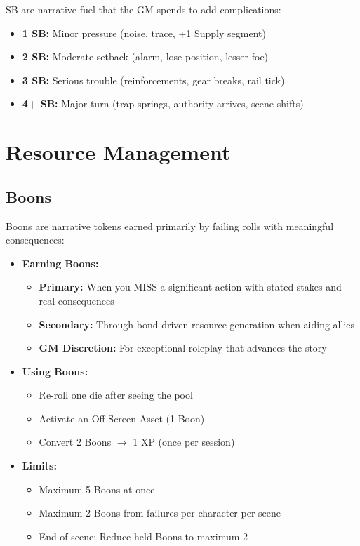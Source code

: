 \documentclass[11pt]{article}
\begin{document}
SB are narrative fuel that the GM spends to add complications:
\begin{itemize}
\item \textbf{1 SB:} Minor pressure (noise, trace, +1 Supply segment)
\item \textbf{2 SB:} Moderate setback (alarm, lose position, lesser foe)
\item \textbf{3 SB:} Serious trouble (reinforcements, gear breaks, rail tick)
\item \textbf{4+ SB:} Major turn (trap springs, authority arrives, scene shifts)
\end{itemize}

\section{Resource Management}

\subsection{Boons}

Boons are narrative tokens earned primarily by failing rolls with meaningful consequences:

\begin{itemize}
\item \textbf{Earning Boons:}
   \begin{itemize}
   \item \textbf{Primary:} When you MISS a significant action with stated stakes and real consequences
   \item \textbf{Secondary:} Through bond-driven resource generation when aiding allies
   \item \textbf{GM Discretion:} For exceptional roleplay that advances the story
   \end{itemize}
\item \textbf{Using Boons:}
   \begin{itemize}
   \item Re-roll one die after seeing the pool
   \item Activate an Off-Screen Asset (1 Boon)
   \item Convert 2 Boons $\rightarrow$ 1 XP (once per session)
   \end{itemize}
\item \textbf{Limits:}
   \begin{itemize}
   \item Maximum 5 Boons at once
   \item Maximum 2 Boons from failures per character per scene
   \item End of scene: Reduce held Boons to maximum 2
   \end{itemize}
\end{itemize}
\end{document}
